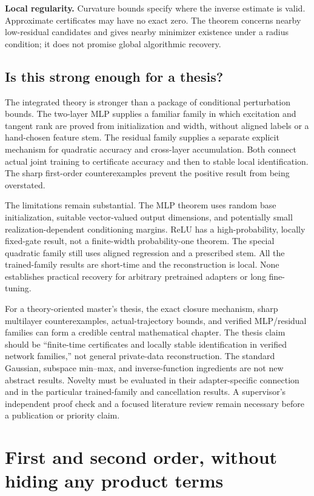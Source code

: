 \documentclass[12pt,a4paper]{article}
\theoremstyle{readable}
\theoremstyle{definition}\newtheorem{example}[theorem]{Example}
\begin{document}
\textbf{Local regularity.} Curvature bounds specify where the inverse estimate is valid. Approximate certificates may have no exact zero. The theorem concerns nearby low-residual candidates and gives nearby minimizer existence under a radius condition; it does not promise global algorithmic recovery.

\subsection{Is this strong enough for a thesis?}
The integrated theory is stronger than a package of conditional perturbation bounds. The two-layer MLP supplies a familiar family in which excitation and tangent rank are proved from initialization and width, without aligned labels or a hand-chosen feature stem. The residual family supplies a separate explicit mechanism for quadratic accuracy and cross-layer accumulation. Both connect actual joint training to certificate accuracy and then to stable local identification. The sharp first-order counterexamples prevent the positive result from being overstated.

The limitations remain substantial. The MLP theorem uses random base initialization, suitable vector-valued output dimensions, and potentially small realization-dependent conditioning margins. ReLU has a high-probability, locally fixed-gate result, not a finite-width probability-one theorem. The special quadratic family still uses aligned regression and a prescribed stem. All the trained-family results are short-time and the reconstruction is local. None establishes practical recovery for arbitrary pretrained adapters or long fine-tuning.

For a theory-oriented master's thesis, the exact closure mechanism, sharp multilayer counterexamples, actual-trajectory bounds, and verified MLP/residual families can form a credible central mathematical chapter. The thesis claim should be ``finite-time certificates and locally stable identification in verified network families,'' not general private-data reconstruction. The standard Gaussian, subspace min--max, and inverse-function ingredients are not new abstract results. Novelty must be evaluated in their adapter-specific connection and in the particular trained-family and cancellation results. A supervisor's independent proof check and a focused literature review remain necessary before a publication or priority claim.

\appendix
\section{First and second order, without hiding any product terms}
\label{app:orders}
\end{document}
